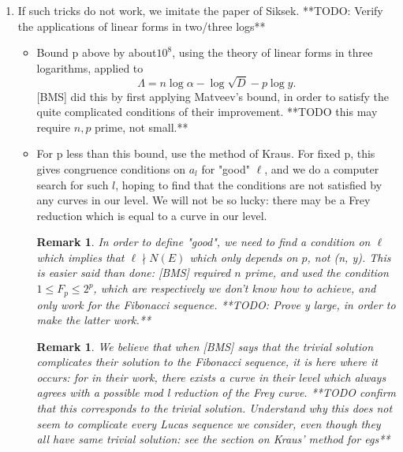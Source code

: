 \documentclass[12pt]{article}
\newtheorem{rem}[thm]{Remark}
\begin{document}
\begin{enumerate}
	\begin{rem}
	If we descend to a curve (or abelian variety) with complex multiplication, we can likely find an immediate contradiction. However, this is of little use to us, as we are often in square-free levels, i.e. semistable elliptic curves, which cannot be CM, since CM implies potentially good. To tell if your abelian varieties have complex multiplication, the only method we know of is to construct enough distinct Hecke characters of the specified conductor. This appears to work only if all abelian varieties at the level had complex multiplication. **QUESTION Can we detect CM abelian varieties?**
	\end{rem}

\item If such tricks do not work, we imitate the paper of Siksek. 
**TODO: Verify the applications of linear forms in two/three logs**
\begin{itemize}
	\item Bound p above by about$10^8$, using the theory of linear forms in three logarithms, applied to 
	\[\Lambda = n \log \alpha - \log \sqrt{D} - p \log{y}. \]
	[BMS] did this by first applying Matveev's bound, in order to satisfy the quite complicated conditions of their improvement.
	 **TODO this may require $n, p$ prime, not small.**
	\item For p less than this bound, use the method of Kraus. For fixed p, this gives congruence conditions on $a_l$ for "good" $\ell$, and we do a computer search for such $l$, hoping to find that the conditions are not satisfied by any curves in our level. We will not be so lucky: there may be a Frey reduction which is equal to a curve in our level.
	\begin{rem}	
	 In order to define "good", we need to find a condition on $\ell$ which implies that $\ell \nmid N(E)$ which only depends on $p$, not (n, y). This is easier said than done: [BMS] required $n$ prime, and used the condition $1 \le F_p \le 2^p$, which are respectively we don't know how to achieve, and only work for the Fibonacci sequence. **TODO: Prove y large, in order to make the latter work.**
\end{rem}
\begin{rem}
	We believe that when [BMS] says that the trivial solution complicates their solution to the Fibonacci sequence, it is here where it occurs: for in their work, there exists a curve in their level which always agrees with a possible mod l reduction of the Frey curve. 
**TODO confirm that this corresponds to the trivial solution. Understand why this does not seem to complicate every Lucas sequence we consider, even though they all have same trivial solution: see the section on Kraus' method for egs**
\end{rem}


\end{itemize}
\end{enumerate}
\end{document}
